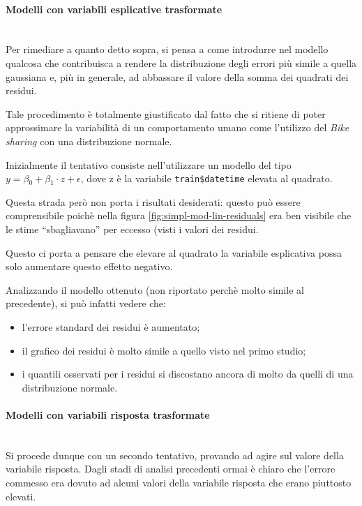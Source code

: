 \paragraph{Modelli con variabili esplicative trasformate} \mbox{}\\
Per rimediare a quanto detto sopra, si pensa a come introdurre nel modello
qualcosa che contribuisca a rendere la distribuzione degli errori più simile
a quella gaussiana e, più in generale, ad abbassare il valore della somma dei
quadrati dei residui.

Tale procedimento è totalmente giustificato dal fatto che si ritiene di poter
approssimare la variabilità di un comportamento umano come l'utilizzo del
\emph{Bike sharing} con una distribuzione normale.

Inizialmente il tentativo consiste nell'utilizzare un modello del tipo
$ y = \beta{}_0 + \beta{}_1 \cdot{} z + \epsilon{} $, dove z è la variabile
\texttt{train\$datetime} elevata al quadrato.

Questa strada però non porta i risultati desiderati: questo può essere
comprensibile poichè nella figura \ref{fig:simpl-mod-lin-residuals} era ben
visibile che le stime ``sbagliavano'' per eccesso (visti i valori dei residui.

Questo ci porta a pensare che elevare al quadrato la variabile esplicativa
possa solo aumentare questo effetto negativo.

Analizzando il modello ottenuto (non riportato perchè molto simile al
precedente), si può infatti vedere che:

\begin{itemize}
\item l'errore standard dei residui è aumentato;
\item il grafico dei residui è molto simile a quello visto nel primo studio;
\item i quantili osservati per i residui si discostano ancora di molto da
  quelli di una distribuzione normale.
\end{itemize}

\paragraph{Modelli con variabili risposta trasformate} \mbox{}\\
Si procede dunque con un secondo tentativo, provando ad agire sul valore della
variabile risposta. Dagli stadi di analisi precedenti ormai è chiaro che
l'errore commesso era dovuto ad alcuni valori della variabile risposta che
erano piuttosto elevati.

